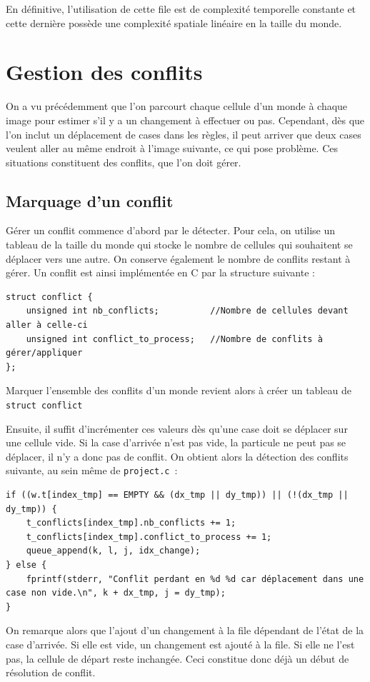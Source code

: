 En définitive, l'utilisation de cette file est de complexité temporelle constante et cette dernière possède une complexité spatiale linéaire en la taille du monde.

\section{Gestion des conflits}
On a vu précédemment que l'on parcourt chaque cellule d'un monde à chaque image pour estimer s'il y a un changement à effectuer ou pas. Cependant, dès que l'on inclut un déplacement de cases dans les règles, il peut arriver que deux cases veulent aller au même endroit à l'image suivante, ce qui pose problème. Ces situations constituent des conflits, que l'on doit gérer.

\subsection{Marquage d'un conflit}
Gérer un conflit commence d'abord par le détecter. Pour cela, on utilise un tableau de la taille du monde qui stocke le nombre de cellules qui souhaitent se déplacer vers une autre. On conserve également le nombre de conflits restant à gérer. Un conflit est ainsi implémentée en C par la structure suivante :
\begin{lstlisting}
struct conflict {
    unsigned int nb_conflicts;          //Nombre de cellules devant aller à celle-ci
    unsigned int conflict_to_process;   //Nombre de conflits à gérer/appliquer
};
\end{lstlisting}

Marquer l'ensemble des conflits d'un monde revient alors à créer un tableau de \lstinline{struct conflict}

Ensuite, il suffit d'incrémenter ces valeurs dès qu'une case doit se déplacer sur une cellule vide. Si la case d'arrivée n'est pas vide, la particule ne peut pas se déplacer, il n'y a donc pas de conflit. On obtient alors la détection des conflits suivante, au sein même de \texttt{project.c}~:
\begin{lstlisting}
if ((w.t[index_tmp] == EMPTY && (dx_tmp || dy_tmp)) || (!(dx_tmp || dy_tmp)) {
    t_conflicts[index_tmp].nb_conflicts += 1;
    t_conflicts[index_tmp].conflict_to_process += 1;
    queue_append(k, l, j, idx_change);
} else {
    fprintf(stderr, "Conflit perdant en %d %d car déplacement dans une case non vide.\n", k + dx_tmp, j = dy_tmp);
}
\end{lstlisting}
On remarque alors que l'ajout d'un changement à la file dépendant de l'état de la case d'arrivée. Si elle est vide, un changement est ajouté à la file. Si elle ne l'est pas, la cellule de départ reste inchangée. Ceci constitue donc déjà un début de résolution de conflit.

